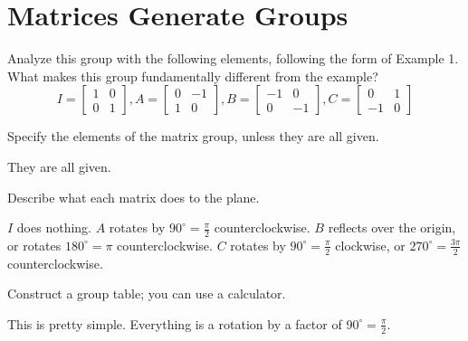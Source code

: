\documentclass[../key.tex]{subfiles}
\begin{document}
\section{Matrices Generate Groups}

\begin{outer_problem}[start=1]
\item Analyze this group with the following elements, following the form of Example 1. What makes this group fundamentally different from the example?
$$I=\left[\begin{array}{cc} 1 & 0 \\ 0 & 1 \end{array}\right], A=\left[\begin{array}{cc} 0 & -1 \\ 1 & 0 \end{array}\right], B=\left[\begin{array}{cc} -1 & 0 \\ 0 & -1 \end{array}\right], C=\left[\begin{array}{cc} 0 & 1 \\ -1 & 0 \end{array}\right]$$
\end{outer_problem}

\begin{iinner_problem}[start=1]
\item Specify the elements of the matrix group, unless they are all given.
\end{iinner_problem}

They are all given.

\begin{iinner_problem}
\item Describe what each matrix does to the plane.
\end{iinner_problem}

$I$ does nothing. $A$ rotates by $90^\circ=\frac{\pi}{2}$ counterclockwise. $B$ reflects over the origin, or rotates $180^\circ=\pi$ counterclockwise. $C$ rotates by $90^\circ=\frac{\pi}{2}$ clockwise, or $270^\circ=\frac{3\pi}{2}$ counterclockwise.

\begin{iinner_problem}
\item Construct a group table; you can use a calculator.
\end{iinner_problem}

This is pretty simple. Everything is a rotation by a factor of $90^\circ=\frac{\pi}{2}$.
\end{document}
